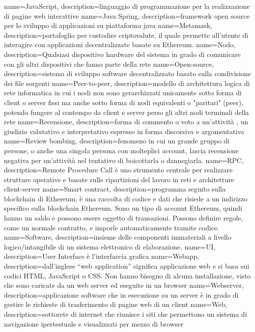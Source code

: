  { name={JavaScript}, description={linguaggio di programmazione per la realizzazione di pagine web interattive} }
 { name={Java Spring}, description={framework open source per lo sviluppo di applicazioni su piattaforma java} }
 { name={Metamask}, description={portafoglio per custodire criptovalute, il quale permette all'utente di interagire con applicazioni decentralizzate basate su Ethereum.} }
 { name={Nodo}, description={Qualsiasi dispositivo hardware del sistema in grado di comunicare con gli altri dispositivi che fanno parte della rete} }
 { name={Open-source}, description={sistema di sviluppo software decentralizzato basato sulla condivisione dei file sorgenti} }
 { name={Peer-to-peer}, description={modello di architettura logica di rete informatica in cui i nodi non sono gerarchizzati unicamente sotto forma di client o server fissi ma anche sotto forma di nodi equivalenti o "paritari" (peer), potendo fungere al contempo da client e server perso gli altri nodi terminali della rete} }
 { name={Recensione}, description={forma di commento o voto a un'attività , un giudizio valutativo e interpretativo espresso in forma discorsiva e argomentativa} }
 { name={Review bombing}, description={fenomeno in cui un grande gruppo di persone, o anche una singola persona con molteplici account, lascia recensione negativa per un'attività nel tentativo di boicottarla o dannegiarla.} }
 { name={RPC}, description={Remote Procedure Call è uno strumento centrale per realizzare strutture operative e basate sulle ripartizioni del lavoro in reti e architetture client-server} }
 { name={Smart contract}, description={programma seguito sulla blockchain di Ethereum; è una raccolta di codice e dati che risiede a un indirizzo specifico sulla blockchain Ethereum. Sono un tipo di account Ethereum, quindi hanno un saldo e possono essere oggetto di transazioni. Possono definire regole, come un normale contratto, e imporle automaticamente tramite codice.} }
 { name={Software}, description={insieme delle componenti immateriali a livello logico/intangibile di un sistema elettronico di elaborazione.} }
 { name={UI}, description={User Interface è l'interfaccia grafica} }
 { name={Webapp}, description={dall'inglese “web application” significa applicazione web e si basa sui codici HTML, JavaScript o CSS. Non hanno bisogno di alcuna installazione, visto che sono caricate da un web server ed eseguite in un browser} }
 { name={Webserver}, description={applicazione software che in esecuzione su un server è in grado di gestire le richieste di trasferimento di pagine web di un client} }
 { name={Web}, description={sottorete di internet che riunisce i siti che permettono un sistema di navigazione ipertestuale e visualizzati per mezzo di browser} }
